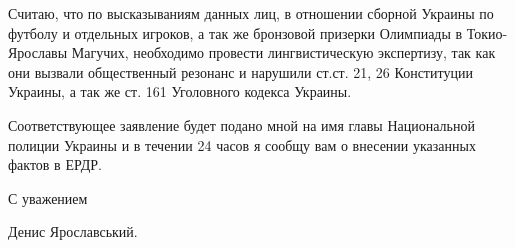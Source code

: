 Считаю, что по высказываниям данных лиц, в отношении сборной Украины по футболу
и отдельных игроков, а так же бронзовой призерки Олимпиады в Токио- Ярославы
Магучих, необходимо провести лингвистическую экспертизу, так как они вызвали
общественный резонанс и нарушили ст.ст. 21, 26 Конституции Украины, а так же
ст. 161 Уголовного кодекса Украины. 

Соответствующее заявление будет подано мной на имя главы Национальной полиции
Украины и в течении 24 часов я сообщу вам о внесении указанных фактов в ЕРДР. 

С уважением 

Денис Ярославський.


